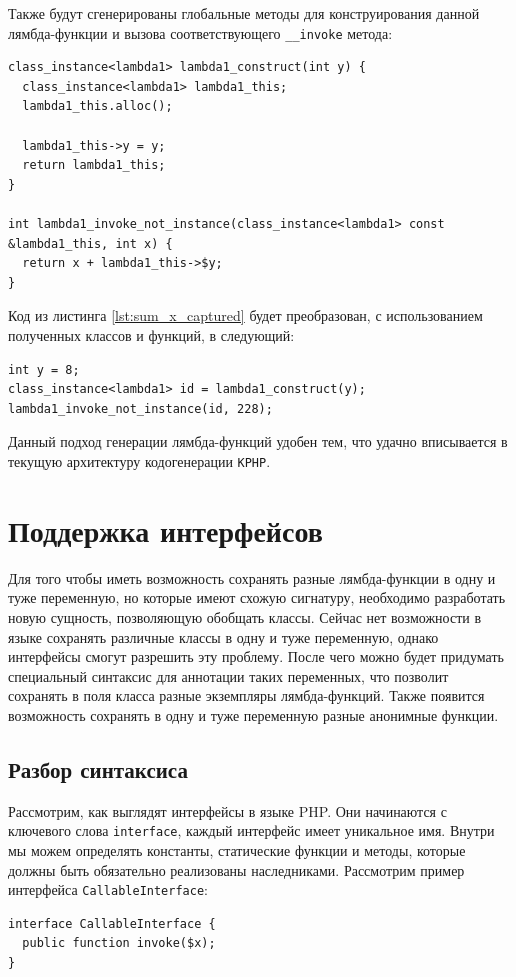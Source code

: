 Также будут сгенерированы глобальные методы для конструирования данной лямбда-функции и вызова соответствующего \verb|__invoke| метода:
\begin{lstlisting}
class_instance<lambda1> lambda1_construct(int y) {
  class_instance<lambda1> lambda1_this;
  lambda1_this.alloc();

  lambda1_this->y = y;
  return lambda1_this;
}

int lambda1_invoke_not_instance(class_instance<lambda1> const &lambda1_this, int x) {
  return x + lambda1_this->$y;
}
\end{lstlisting}

Код из листинга \ref{lst:sum_x_captured} будет преобразован, с использованием полученных классов и функций, в следующий:
\begin{lstlisting}
int y = 8;
class_instance<lambda1> id = lambda1_construct(y);
lambda1_invoke_not_instance(id, 228);
\end{lstlisting}

Данный подход генерации лямбда-функций удобен тем, что удачно вписывается в текущую архитектуру кодогенерации \verb|KPHP|.

\section{Поддержка интерфейсов}
Для того чтобы иметь возможность сохранять разные лямбда-функции в одну и туже переменную, но которые имеют схожую сигнатуру, необходимо разработать новую сущность, позволяющую обобщать классы.
Сейчас нет возможности в языке сохранять различные классы в одну и туже переменную, однако интерфейсы смогут разрешить эту проблему.
После чего можно будет придумать специальный синтаксис для аннотации таких переменных, что позволит сохранять в поля класса разные экземпляры лямбда-функций.
Также появится возможность сохранять в одну и туже переменную разные анонимные функции.

\subsection{Разбор синтаксиса}
Рассмотрим, как выглядят интерфейсы в языке PHP.
Они начинаются с ключевого слова \verb|interface|, каждый интерфейс имеет уникальное имя.
Внутри мы можем определять константы, статические функции и методы, которые должны быть обязательно реализованы наследниками.
Рассмотрим пример интерфейса \verb|CallableInterface|:
\begin{lstlisting}[caption={Пример интерфейса Callable},label={lst:callable-interface-example}]
interface CallableInterface {
  public function invoke($x);
}
\end{lstlisting}

